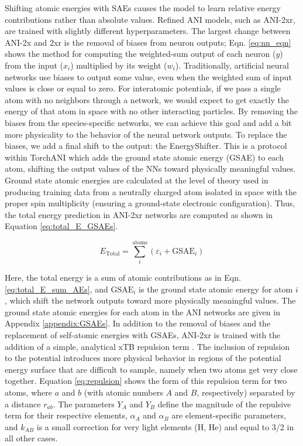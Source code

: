 Shifting atomic energies with SAEs causes the model to learn relative energy contributions rather than absolute values. 
Refined ANI models, such as ANI-2xr, are trained with slightly different hyperparameters.
The largest change between ANI-2x and 2xr is the removal of biases from neuron outputs; Eqn. \ref{eq:nn_eqn} shows the method for computing the weighted-sum output of each neuron ($y$) from the input ($x_i$) multiplied by its weight ($w_i$).
Traditionally, artificial neural networks use biases to output some value, even when the weighted sum of input values is close or equal to zero.
For interatomic potentials, if we pass a single atom with no neighbors through a network, we would expect to get exactly the energy of that atom in space with no other interacting particles.
By removing the biases from the species-specific networks, we can achieve this goal and add a bit more physicality to the behavior of the neural network outputs.
To replace the biases, we add a final shift to the output: the EnergyShifter.
This is a protocol within TorchANI which adds the ground state atomic energy (GSAE) to each atom, shifting the output values of the NNs toward physically meaningful values.
Ground state atomic energies are calculated at the level of theory used in producing training data from a neutrally charged atom isolated in space with the proper spin multiplicity (ensuring a ground-state electronic configuration).
Thus, the total energy prediction in ANI-2xr networks are computed as shown in Equation \ref{eq:total_E_GSAEs}.

\begin{equation}
    E_{\text{Total}} = 
    \sum_{i}^{\text{atoms}} 
    \left(
    \varepsilon_i + \text{GSAE}_i
    \right)
    \label{eq:total_E_GSAEs}
\end{equation}

Here, the total energy is a sum of atomic contributions as in Eqn. \ref{eq:total_E_sum_AEs}, and $\text{GSAE}_i$ is the ground state atomic energy for atom $i$, which shift the network outputs toward more physically meaningful values.
The ground state atomic energies for each atom in the ANI networks are given in Appendix \ref{appendix:GSAEs}.
In addition to the removal of biases and the replacement of self-atomic energies with GSAEs, ANI-2xr is trained with the addition of a simple, analytical xTB repulsion term \cite{xtb_repulsion}.
The inclusion of repulsion to the potential introduces more physical behavior in regions of the potential energy surface that are difficult to sample, namely when two atoms get very close together.
Equation \ref{eq:repulsion} shows the form of this repulsion term for two atoms, where $a$ and $b$ (with atomic numbers $A$ and $B$, respectively) separated by a distance $r_{ab}$. 
The parameters $Y_A$ and $Y_B$ define the magnitude of the repulsive term for their respective elements, $\alpha_{A}$ and $\alpha_{B}$ are element-specific parameters, and $k_{AB}$ is a small correction for very light elements (H, He) and equal to 3/2 in all other cases.

